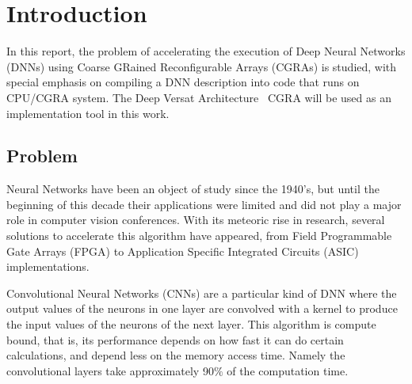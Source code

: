 
\chapter{Introduction}
\label{chapter:introduction}




In this report, the problem of accelerating the execution of Deep Neural
Networks (DNNs) using Coarse GRained Reconfigurable Arrays (CGRAs) is studied,
with special emphasis on compiling a DNN description into code that runs on
CPU/CGRA system. The Deep Versat Architecture~\cite{valter:deepversat} CGRA will be used as an
implementation tool in this work.


\section{Problem}
\label{section:problem}

Neural Networks have been an object of study since the 1940's, but until the
beginning of this decade their applications were limited and did not play a
major role in computer vision conferences. With its meteoric rise in research,
several solutions to accelerate this algorithm have appeared, from Field Programmable Gate Arrays (FPGA) to
Application Specific Integrated Circuits (ASIC) implementations.

Convolutional Neural Networks (CNNs) are a particular kind of DNN where the output
values of the neurons in one layer are convolved with a kernel to produce the
input values of the neurons of the next layer. This algorithm is compute bound,
that is, its performance depends on how fast it can do certain calculations, and
depend less on the memory access time. Namely the convolutional layers take
approximately 90$\%$ of the computation time.


